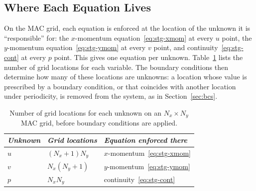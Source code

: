 \subsection{Where Each Equation Lives}

On the MAC grid, each equation is enforced at the location of the unknown it is ``responsible'' for: the $x$-momentum equation~\eqref{eq:stg-xmom} at every $u$ point, the $y$-momentum equation~\eqref{eq:stg-ymom} at every $v$ point, and continuity~\eqref{eq:stg-cont} at every $p$ point. This gives one equation per unknown. Table~\ref{tab:stg-counts} lists the number of grid locations for each variable. The boundary conditions then determine how many of these locations are unknowns: a location whose value is prescribed by a boundary condition, or that coincides with another location under periodicity, is removed from the system, as in Section~\ref{sec:bcs}.

\begin{table}[h!]
    \centering
    \begin{tabular}{|>{\raggedright\arraybackslash}p{2cm}|>{\raggedright\arraybackslash}p{3cm}||>{\raggedright\arraybackslash}p{7cm}|}
        \hline
        \textit{Unknown} & \textit{Grid locations} & \textit{Equation enforced there} \\
        \hline
        $u$ & $(N_x + 1) N_y$ & $x$-momentum~\eqref{eq:stg-xmom} \\
        $v$ & $N_x (N_y + 1)$ & $y$-momentum~\eqref{eq:stg-ymom} \\
        $p$ & $N_x N_y$ & continuity~\eqref{eq:stg-cont} \\
        \hline
    \end{tabular}
    \caption{Number of grid locations for each unknown on an $N_x\times N_y$ MAC grid, before boundary conditions are applied.}
    \label{tab:stg-counts}
\end{table}

